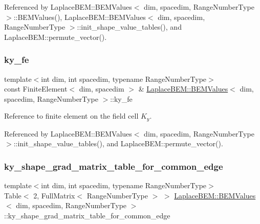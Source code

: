 Referenced by Laplace\+B\+E\+M\+::\+B\+E\+M\+Values$<$ dim, spacedim, Range\+Number\+Type $>$\+::\+B\+E\+M\+Values(), Laplace\+B\+E\+M\+::\+B\+E\+M\+Values$<$ dim, spacedim, Range\+Number\+Type $>$\+::init\+\_\+shape\+\_\+value\+\_\+tables(), and Laplace\+B\+E\+M\+::permute\+\_\+vector().

\mbox{\label{classLaplaceBEM_1_1BEMValues_a30eaa0b6f1e587c5b8d95a04d80fa9a8}} 
\subsubsection{\texorpdfstring{ky\+\_\+fe}{ky\_fe}}
{\footnotesize\ttfamily template$<$int dim, int spacedim, typename Range\+Number\+Type$>$ \\
const Finite\+Element$<$ dim, spacedim $>$ \& \hyperlink{classLaplaceBEM_1_1BEMValues}{Laplace\+B\+E\+M\+::\+B\+E\+M\+Values}$<$ dim, spacedim, Range\+Number\+Type $>$\+::ky\+\_\+fe}

Reference to finite element on the field cell $K_y$. 

Referenced by Laplace\+B\+E\+M\+::\+B\+E\+M\+Values$<$ dim, spacedim, Range\+Number\+Type $>$\+::init\+\_\+shape\+\_\+value\+\_\+tables(), and Laplace\+B\+E\+M\+::permute\+\_\+vector().

\mbox{\label{classLaplaceBEM_1_1BEMValues_a8b8a0368ac2b1b7c2ac17a2a4b95f997}} 
\subsubsection{\texorpdfstring{ky\+\_\+shape\+\_\+grad\+\_\+matrix\+\_\+table\+\_\+for\+\_\+common\+\_\+edge}{ky\_shape\_grad\_matrix\_table\_for\_common\_edge}}
{\footnotesize\ttfamily template$<$int dim, int spacedim, typename Range\+Number\+Type$>$ \\
Table$<$ 2, Full\+Matrix$<$ Range\+Number\+Type $>$ $>$ \hyperlink{classLaplaceBEM_1_1BEMValues}{Laplace\+B\+E\+M\+::\+B\+E\+M\+Values}$<$ dim, spacedim, Range\+Number\+Type $>$\+::ky\+\_\+shape\+\_\+grad\+\_\+matrix\+\_\+table\+\_\+for\+\_\+common\+\_\+edge}

